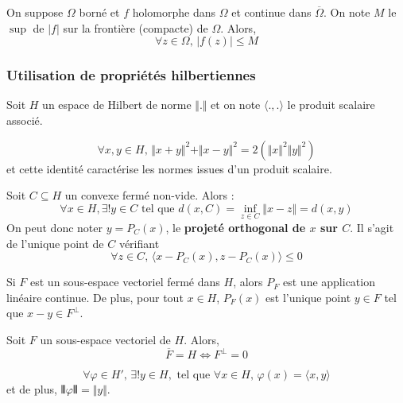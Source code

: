   \begin{theorem}
    On suppose $\Omega$ borné et $f$ holomorphe dans $\Omega$ et continue dans $\overline{\Omega}$. On note $M$ le $\sup$ de $\vert f \vert$ sur la frontière (compacte) de $\Omega$. Alors,
    \[ \forall z \in \Omega, \, \vert f(z) \vert \leq M \]
  \end{theorem}

  \subsubsection{Utilisation de propriétés hilbertiennes}


  Soit $H$ un espace de Hilbert de norme $\Vert . \Vert$ et on note $\langle ., . \rangle$ le produit scalaire associé.

  \begin{lemma}
    \[ \forall x, y \in H, \, \Vert x + y \Vert^2 + \Vert x - y \Vert^2 = 2(\Vert x \Vert^2 \Vert y \Vert^2) \]
    et cette identité caractérise les normes issues d'un produit scalaire.
  \end{lemma}


  \begin{theorem}
    Soit $C \subseteq H$ un convexe fermé non-vide. Alors :
    \[ \forall x \in H, \exists! y \in C \text{ tel que } d(x, C) = \inf_{z \in C} \Vert x - z \Vert = d(x, y) \]
    On peut donc noter $y = P_C(x)$, le \textbf{projeté orthogonal de $x$ sur $C$}. Il s'agit de l'unique point de $C$ vérifiant
    \[ \forall z \in C, \, \langle x - P_C(x), z - P_C(x) \rangle \leq 0 \]
  \end{theorem}

  \begin{theorem}
    Si $F$ est un sous-espace vectoriel fermé dans $H$, alors $P_F$ est une application linéaire continue. De plus, pour tout $x \in H$, $P_F(x)$ est l'unique point $y \in F$ tel que $x-y \in F^\perp$.
  \end{theorem}

  \begin{application}
    Soit $F$ un sous-espace vectoriel de $H$. Alors,
    \[ \overline{F} = H \iff F^\perp = 0 \]
  \end{application}

  \begin{application}
    \[ \forall \varphi \in H', \, \exists! y \in H, \text{ tel que } \forall x \in H, \, \varphi(x) = \langle x, y \rangle \]
    et de plus, $\VERT \varphi \VERT = \Vert y \Vert$.
  \end{application}

